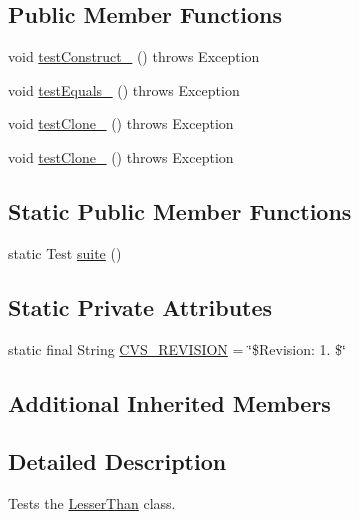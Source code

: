\subsection*{Public Member Functions}
\begin{DoxyCompactItemize}
\item 
void \hyperlink{classorg_1_1jgap_1_1gp_1_1function_1_1_lesser_than_test_a4d33c073c71d6116382028922c34fc2d}{test\-Construct\-\_} ()  throws Exception 
\item 
void \hyperlink{classorg_1_1jgap_1_1gp_1_1function_1_1_lesser_than_test_a6ce92a58f3fdd48b5e119e6406c09339}{test\-Equals\-\_} ()  throws Exception 
\item 
void \hyperlink{classorg_1_1jgap_1_1gp_1_1function_1_1_lesser_than_test_a8a09871defd2dbfc5dc5bc61fd7b212a}{test\-Clone\-\_} ()  throws Exception 
\item 
void \hyperlink{classorg_1_1jgap_1_1gp_1_1function_1_1_lesser_than_test_a595a0cd2858b3cba0f30de57cb9d8c38}{test\-Clone\-\_} ()  throws Exception 
\end{DoxyCompactItemize}
\subsection*{Static Public Member Functions}
\begin{DoxyCompactItemize}
\item 
static Test \hyperlink{classorg_1_1jgap_1_1gp_1_1function_1_1_lesser_than_test_ad7c3525fa1264cf3249daf4194499960}{suite} ()
\end{DoxyCompactItemize}
\subsection*{Static Private Attributes}
\begin{DoxyCompactItemize}
\item 
static final String \hyperlink{classorg_1_1jgap_1_1gp_1_1function_1_1_lesser_than_test_aa78007efd71d369041019932f9000131}{C\-V\-S\-\_\-\-R\-E\-V\-I\-S\-I\-O\-N} = \char`\"{}\$Revision\-: 1. \$\char`\"{}
\end{DoxyCompactItemize}
\subsection*{Additional Inherited Members}


\subsection{Detailed Description}
Tests the \hyperlink{classorg_1_1jgap_1_1gp_1_1function_1_1_lesser_than}{Lesser\-Than} class.

